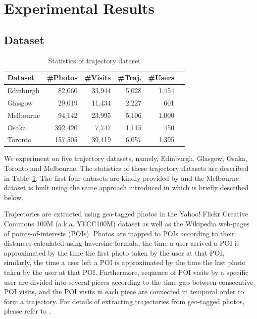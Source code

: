 \section{Experimental Results}
\label{sec:experiment}

\subsection{Dataset}
\label{sec:dataset}

\begin{table}
\caption{Statistics of trajectory dataset}
\label{tab:data}
\centering
\begin{tabular}{l*{5}{r}} \hline
\textbf{Dataset} & \textbf{\#Photos} & \textbf{\#Visits} & \textbf{\#Traj.} & \textbf{\#Users} \\ \hline
Edinburgh & 82,060 & 33,944 & 5,028 & 1,454 \\
Glasgow & 29,019 & 11,434 & 2,227 & 601 \\
Melbourne & 94,142 & 23,995 & 5,106 & 1,000 \\
Osaka & 392,420 & 7,747 & 1,115 & 450 \\
Toronto & 157,505 & 39,419 & 6,057 & 1,395 \\
\hline
\end{tabular}
\end{table}


We experiment on five trajectory datasets, namely, Edinburgh, Glasgow, Osaka, Toronto and Melbourne.
The statistics of these trajectory datasets are described in Table~\ref{tab:data}.
The first four datasets are kindly provided by \cite{ijcai15} and the Melbourne dataset is built using
the same approach introduced in \cite{ht10, ijcai15} which is briefly described below.

Trajectories are extracted using  geo-tagged photos in the Yahoo! Flickr Creative Commons 100M
(a.k.a. YFCC100M) dataset\cite{thomee2016yfcc100m} as well as the Wikipedia web-pages of points-of-interests (POIs).
Photos are mapped to POIs according to their distances calculated using haversine formula\cite{haversine},
the time a user arrived a POI is approximated by the time the first photo taken by the user at that POI,
similarly, the time a user left a POI is approximated by the time the last photo taken 
by the user at that POI. 
Furthermore, sequence of POI visits by a specific user are divided into several pieces according to
the time gap between consecutive POI visits, and the POI visits in each piece are connected in temporal order
to form a trajectory. 
For details of extracting trajectories from geo-tagged photos, please refer to \cite{ht10, ijcai15}.



